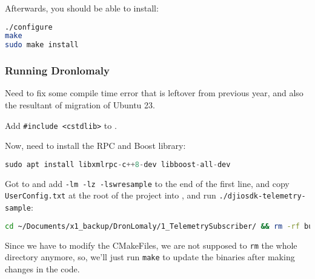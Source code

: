 Afterwards, you should be able to install:
\begin{lstlisting}[language=bash]
./configure
make
sudo make install
\end{lstlisting}

\subsubsection{Running Dronlomaly}

Need to fix some compile time error that is leftover from previous year, and also the resultant of migration of Ubuntu 23.

Add \texttt{\#include <cstdlib>} to .

Now, need to install the RPC and Boost library:
\begin{lstlisting}[language=C++]
sudo apt install libxmlrpc-c++8-dev libboost-all-dev
\end{lstlisting}

Got to  and add \texttt{-lm -lz -lswresample} to the end of the first line, and copy \texttt{UserConfig.txt} at the root of the project into , and run \texttt{./djiosdk-telemetry-sample}:
\begin{lstlisting}[language=bash]
cd ~/Documents/x1_backup/DronLomaly/1_TelemetrySubscriber/ && rm -rf build && mkdir build && cd build && cmake .. && make && cp ../../UserConfig.txt bin
\end{lstlisting}
Since we have to modify the CMakeFiles, we are not supposed to \texttt{rm} the whole directory anymore, so, we'll just run \texttt{make} to update the binaries after making changes in the code.